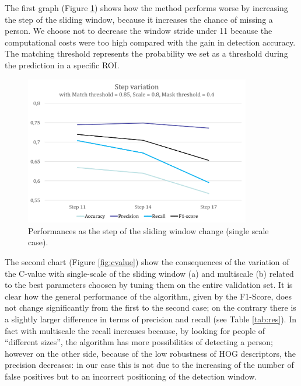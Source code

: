 \documentclass[a4paper,letterpaper, 11pt, onecolumn]{article} %
\begin{document}
The first graph (Figure \ref{fig:step}) shows how the method performs worse by increasing the step of the sliding window, because it increases the chance of missing a person. We choose not to decrease the window stride under 11 because the computational costs were too high compared with the gain in detection accuracy. The matching threshold represents the probability we set as a threshold during the prediction in a specific ROI.
\begin{figure}[h!]
\centering
\includegraphics[height=6.5cm]{step_variation.png} 
\caption{Performances as the step of the sliding window change (single scale case).}
\label{fig:step}
\end{figure}

The second chart (Figure \ref{fig:cvalue}) show the consequences of the variation of the C-value with single-scale of the sliding window (a) and multiscale (b) related to the best parameters choosen by tuning them on the entire validation set. It is clear how the general performance of the algorithm, given by the F1-Score, does not change significantly from the first to the second case; on the contrary there is a slightly larger difference in terms of precision and recall (see Table \ref{tab:res}). In fact with multiscale the recall increases because, by looking for people of ``different sizes'', the algorithm has more possibilities of detecting a person; however on the other side, because of the low robustness of HOG descriptors,  the precision decreases: in our case this is not due to the increasing of the number of false positives but to an incorrect positioning of the detection window. 
\end{document}
